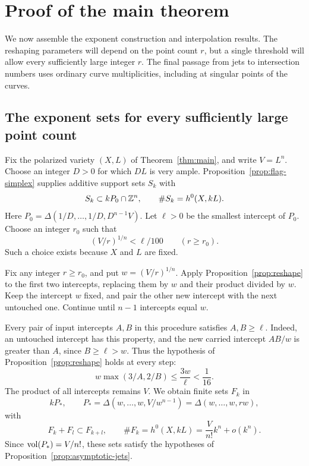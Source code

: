 \section{Proof of the main theorem}
\label{sec:conclusion}

We now assemble the exponent construction and interpolation results. The
reshaping parameters will depend on the point count $r$, but a single
threshold will allow every sufficiently large integer $r$. The final
passage from jets to intersection numbers uses ordinary curve
multiplicities, including at singular points of the curves.

\subsection{The exponent sets for every sufficiently large point count}

Fix the polarized variety $(X,L)$ of Theorem~\ref{thm:main}, and write
$V=L^n$. Choose an integer $D>0$ for which $DL$ is very ample.
Proposition~\ref{prop:flag-simplex} supplies additive support sets $S_k$ with
\[
 S_k\subset kP_0\cap\mathbb Z^n,
 \qquad
 \#S_k=h^0(X,kL).
\]
Here $P_0=\Delta(1/D,\ldots,1/D,D^{n-1}V)$.
Let $\ell>0$ be the smallest intercept of $P_0$. Choose an integer $r_0$
such that
\begin{equation}
 \label{eq:threshold}
 (V/r)^{1/n}<\ell/100\qquad(r\ge r_0).
\end{equation}
Such a choice exists because $X$ and $L$ are fixed.

Fix any integer $r\ge r_0$, and put $w=(V/r)^{1/n}$. Apply
Proposition~\ref{prop:reshape} to the first two intercepts, replacing them
by $w$ and their product divided by $w$. Keep the intercept $w$ fixed, and
pair the other new intercept with the next untouched one. Continue until
$n-1$ intercepts equal $w$.

Every pair of input intercepts $A,B$ in this procedure satisfies
$A,B\ge\ell$. Indeed, an untouched intercept has this property, and the
new carried intercept $AB/w$ is greater than $A$, since $B\ge\ell>w$.
Thus the hypothesis of Proposition~\ref{prop:reshape} holds at every step:
\[
 w\max(3/A,2/B)\le\frac{3w}{\ell}<\frac1{16}.
\]
The product of all intercepts remains $V$. We obtain finite sets $F_k$ in
\begin{equation}
 \label{eq:final-simplex}
 kP_*,\qquad
 P_* =\Delta(w,\ldots,w,V/w^{n-1})
     =\Delta(w,\ldots,w,rw),
\end{equation}
with
\[
 F_k+F_l\subset F_{k+l},
 \qquad
 \#F_k=h^0(X,kL)=\frac{V}{n!}k^n+o(k^n).
\]
Since $\operatorname{vol}(P_*)=V/n!$, these sets satisfy the hypotheses of
Proposition~\ref{prop:asymptotic-jets}.

